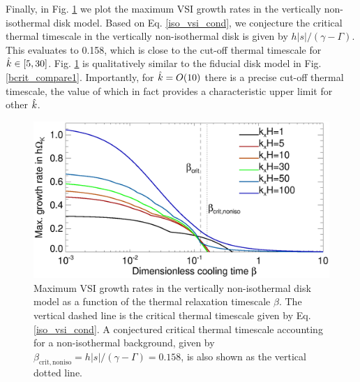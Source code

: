 Finally, in Fig. \ref{bcrit_compare2} we plot the maximum VSI growth
rates in the vertically non-isothermal disk model. Based on 
Eq. \ref{iso_vsi_cond}, we conjecture the critical 
thermal timescale in the vertically non-isothermal disk is 
given by $ h|s|/(\gamma - \Gamma)$. This 
evaluates to 0.158, which is close to the cut-off thermal timescale
for $\hat{k}\in[5,30]$. Fig. \ref{bcrit_compare2} is qualitatively 
similar to the fiducial disk model in
Fig. \ref{bcrit_compare1}. Importantly, for $\hat{k}=O(10)$ there is a
precise cut-off thermal timescale, the value of which in fact provides a  
characteristic upper limit for other $\hat{k}$. 

\begin{figure}
  \includegraphics[width=\linewidth]{figures/gcorr_compare_vnoniso_maxrate} 
  \caption{Maximum VSI growth rates in the vertically non-isothermal disk
    model as a function of the thermal relaxation timescale
    $\beta$. The vertical dashed line is the critical thermal
    timescale given by Eq. \ref{iso_vsi_cond}. A conjectured critical thermal
    timescale accounting for a non-isothermal background, given by 
    $\beta_\mathrm{crit,noniso}= h|s|/(\gamma-\Gamma)=0.158$,  
    is also shown as the vertical dotted line. 
    \label{bcrit_compare2}}   
\end{figure} 





